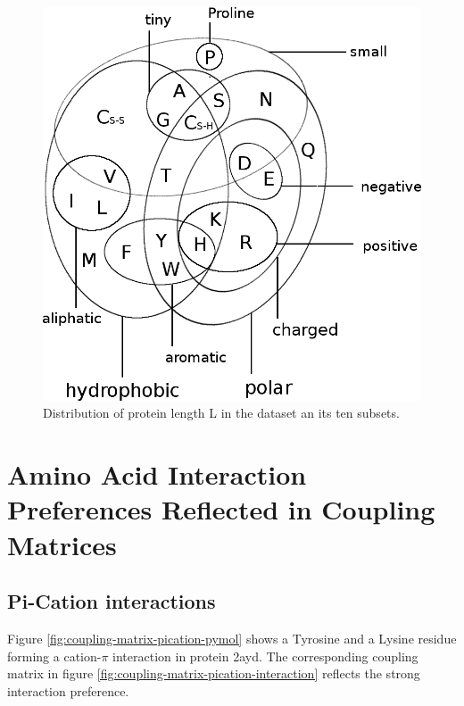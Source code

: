 \documentclass[12pt,a4paper,twoside]{book}
\theoremstyle{definition}
\theoremstyle{definition}
\theoremstyle{remark}
\begin{document}
\begin{figure}
\includegraphics[width=1\linewidth]{img/amino_acid_physico_chemical_properties_venn_diagramm} \caption{Distribution of protein length L in the
dataset an its ten subsets.}\label{fig:dataset-protein-length}
\end{figure}

\chapter{Amino Acid Interaction Preferences Reflected in Coupling
Matrices}\label{amino-acid-interaction-preferences-reflected-in-coupling-matrices}

\section{Pi-Cation interactions}\label{pi-cation}

Figure \ref{fig:coupling-matrix-pication-pymol} shows a Tyrosine and a
Lysine residue forming a cation-\(\pi\) interaction in protein 2ayd. The
corresponding coupling matrix in figure
\ref{fig:coupling-matrix-pication-interaction} reflects the strong
interaction preference.
\end{document}
